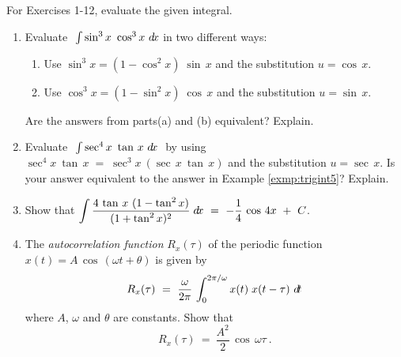 {\small
{}
\par\noindent For Exercises 1-12, evaluate the given integral.
\begin{enumerate}[\bfseries 1.]
[{[\bfseries 1.]}]
 \item Evaluate $~\int \sin^3 x~\cos^3 x~d\!x$ in two different ways:
  \begin{enumerate}[\bfseries (a)]
   \item Use $\sin^3 x = (1 - \cos^2 x)\;\sin\,x$ and the substitution $u=\cos\,x$.
   \item Use $\cos^3 x = (1 - \sin^2 x)\;\cos\,x$ and the substitution $u=\sin\,x$.
  \end{enumerate}
  Are the answers from parts(a) and (b) equivalent? Explain.
 \item Evaluate $~\int \sec^4 x ~\tan\,x~d\!x~$ by using
  $\sec^4 x ~\tan\,x \;=\; \sec^3 x ~(\sec\,x~\tan\,x)$ and the substitution
  $u=\sec\,x$. Is your answer equivalent to the answer in
  Example \ref{exmp:trigint5}? Explain.
 \item Show that $\displaystyle\int \dfrac{4\,\tan\,x~(1 - \tan^2 x)}{(1 +\tan^2 x)^2}\;d\!x
  ~=~ -\frac{1}{4}\,\cos\,4x ~+~ C$.
 \item The \emph{autocorrelation function} $R_x(\tau)$ of the periodic function
  $x(t) = A\,\cos\,(\omega t + \theta)$ is given by
\[
R_x(\tau) ~=~ \frac{\omega}{2\pi}\,\int_0^{2\pi/\omega} x(t)\;x(t-\tau)~d\!t
\]
where $A$, $\omega$ and $\theta$ are constants. Show that
\[
R_x(\tau) ~=~ \frac{A^2}{2}\,\cos\,\omega\tau ~.
\]
\end{enumerate}
}
\newpage
